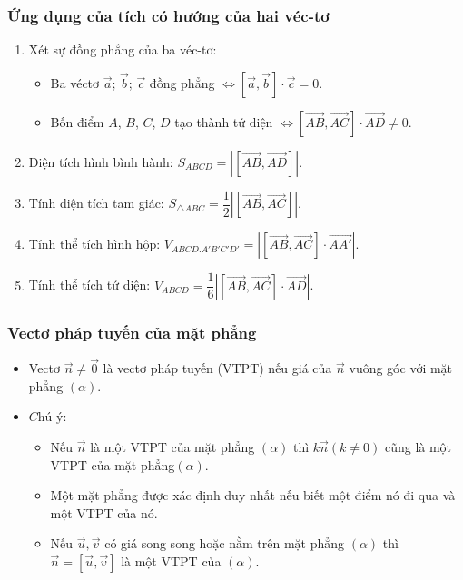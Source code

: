 \begin{tomtat}
	\subsubsection{Ứng dụng của tích có hướng của hai véc-tơ}
	\begin{enumerate}
		\item Xét sự đồng phẳng của ba véc-tơ:
		\begin{itemize}
			\item Ba véctơ $\vec{a}$; $\vec{b}$; $\vec{c}$ đồng phẳng $\Leftrightarrow \left[ \vec{a},\vec{b} \right]\cdot \vec{c}=0$.
			\item Bốn điểm $A$, $B$, $C$, $D$ tạo thành tứ diện $\Leftrightarrow \left[ \vec{AB},\vec{AC} \right]\cdot \vec{AD}\ne 0$.
		\end{itemize}
		\item Diện tích hình bình hành: $S_{ABCD}=\left| \left[ \vec{AB},\vec{AD} \right] \right|$.
		\item Tính diện tích tam giác: $S_{\triangle ABC}=\dfrac{1}{2}\left| \left[ \vec{AB},\vec{AC} \right] \right|$.
		\item Tính thể tích hình hộp: $V_{ABCD.A'B'C'D'}=\left| \left[ \vec{AB},\vec{AC} \right]\cdot\vec{AA'} \right|$.
		\item Tính thể tích tứ diện: $V_{ABCD}=\dfrac{1}{6}\left| \left[ \vec{AB},\vec{AC} \right]\cdot \vec{AD} \right|$.
	\end{enumerate}
\subsubsection{Vectơ pháp tuyến của mặt phẳng}
\begin{itemize}
	\item Vectơ $\overrightarrow{n}\neq \overrightarrow{0}$ là vectơ pháp tuyến (VTPT) nếu giá của $\overrightarrow{n}$ vuông góc với mặt phẳng $(\alpha)$.
	\item $\textit{Chú ý}$:
	\begin{itemize}
		\item Nếu $\overrightarrow{n}$ là một VTPT của mặt phẳng $(\alpha)$ thì $k\overrightarrow{n}$$(k\ne 0)$ cũng là một VTPT của mặt phẳng$(\alpha)$.
		\item Một mặt phẳng được xác định duy nhất nếu biết một điểm nó đi qua và một VTPT của nó.
		\item Nếu $\overrightarrow{u},\overrightarrow{v}$ có giá song song hoặc nằm trên mặt phẳng $(\alpha)$ thì $\overrightarrow{n}=\left[\overrightarrow{u},\overrightarrow{v}\right]$ là một VTPT của $(\alpha)$.
	\end{itemize}
\end{itemize}

\end{tomtat}
